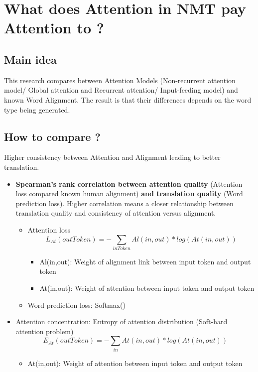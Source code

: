 \documentclass{article}
\begin{document}
\section{What does Attention in NMT pay Attention to ? \citep{Ghader2017what} }
\subsection{Main idea}
This research compares between Attention Models (Non-recurrent attention model/ Global attention and Recurrent attention/ Input-feeding model) and known Word Alignment.
The result is that their differences depends on the word type being generated.
\subsection{How to compare ?}
Higher consistency between Attention and Alignment leading to better translation.

\begin{itemize}
\item \textbf{Spearman's rank correlation between attention quality} (Attention loss compared known human alignment) \textbf{and translation quality} (Word prediction loss).
Higher correlation means a closer relationship between translation quality and consistency of attention versus alignment.
	\begin{itemize}
	\item Attention loss
		\begin{equation}
		L_{At}(outToken) = - \sum_{inToken} Al(in, out) * log(At(in, out))
		\end{equation}
		\begin{itemize}
		\item Al(in,out): Weight of alignment link between input token and output token
		\item At(in,out): Weight of attention between input token and output token
		\end{itemize}

	\item Word prediction loss: Softmax()
	\end{itemize}
	
\item Attention concentration: Entropy of attention distribution (Soft-hard attention problem)
	\begin{equation}
	E_{At}(outToken) = - \sum_{in} At(in, out) * log (At(in, out))
	\end{equation}
	\begin{itemize}
	\item At(in,out): Weight of attention between input token and output token
	\end{itemize}
\end{itemize}
\end{document}
